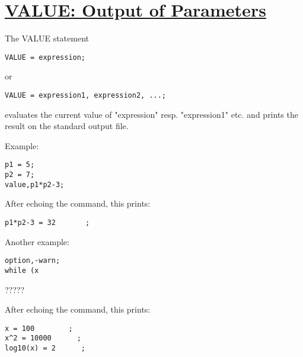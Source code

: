 \section{\href{par_output}{VALUE: Output of Parameters}}
The VALUE statement
\begin{verbatim}
VALUE = expression;
\end{verbatim}
or
\begin{verbatim}
VALUE = expression1, expression2, ...;
\end{verbatim}
evaluates the current value of "expression" resp. "expression1" etc. and
prints the result on the standard output file.

Example:
\begin{verbatim}
p1 = 5;
p2 = 7;
value,p1*p2-3;
\end{verbatim}
After echoing the command, this prints:
\begin{verbatim}
p1*p2-3 = 32       ;
\end{verbatim}

Another example:
\begin{verbatim}
option,-warn;
while (x 
\end{verbatim}
?????

After echoing the command, this prints:
\begin{verbatim}
x = 100        ;       
x^2 = 10000      ;       
log10(x) = 2      ;            
\end{verbatim}


